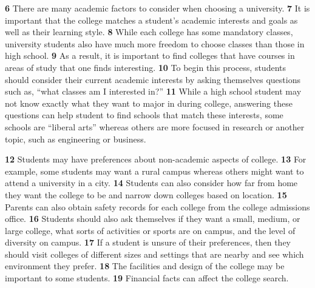 \indent \textbf{6} There are many academic factors to consider when choosing a university. \textbf{7} It is important that the college matches a student’s academic interests and goals as well as their learning style. \textbf{8} While each college has some mandatory classes, university students also have much more freedom to choose classes than those in high school. \textbf{9} As a result, it is important to find colleges that have courses in areas of study that one finds interesting. \textbf{10} To begin this process, students should consider their current academic interests by asking themselves questions such as, ``what classes am I interested in?'' \textbf{11} While a high school student may not know exactly what they want to major in during college, answering these questions can help student to find schools that match these interests, some schools are ``liberal arts'' whereas others are more focused in research or another topic, such as engineering or business.

\indent \textbf{12} Students may have preferences about non-academic aspects of college. \textbf{13} For example, some students may want a rural campus whereas others might want to attend a university in a city. \textbf{14} Students can also consider how far from home they want the college to be and narrow down colleges based on location.  \textbf{15} Parents can also obtain safety records for each college from the college admissions office. \textbf{16} Students should also ask themselves if they want a small, medium, or large college, what sorts of activities or sports are on campus, and the level of diversity on campus. \textbf{17} If a student is unsure of their preferences, then they should visit colleges of different sizes and settings that are nearby and see which environment they prefer. \textbf{18} The facilities and design of the college may be important to some students. \textbf{19} Financial facts can affect the college search. 

